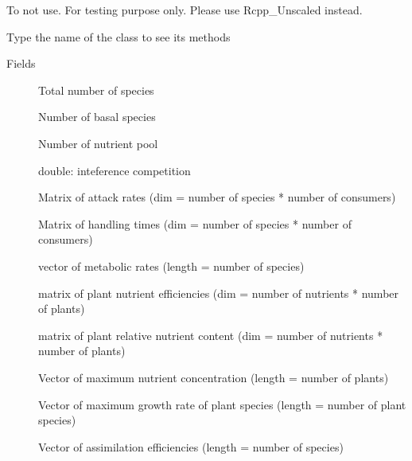 \documentclass[letterpaper]{book}
\begin{document}
%
\begin{Description}\relax
To not use. For testing purpose only. Please use Rcpp\_Unscaled instead.
\end{Description}
%
\begin{Description}\relax
Type the name of the class to see its methods
\end{Description}
%
\begin{Section}{Fields}

\begin{description}

\item[] Total number of species

\item[] Number of basal species

\item[] Number of nutrient pool

\item[] double: inteference competition

\item[] Matrix of attack rates (dim = number of species * number of consumers)

\item[] Matrix of handling times (dim = number of species * number of consumers)

\item[] vector of metabolic rates (length = number of species)

\item[] matrix of plant nutrient efficiencies (dim = number of nutrients * number of plants)

\item[] matrix of plant relative nutrient content (dim = number of nutrients * number of plants)

\item[] Vector of maximum nutrient concentration (length = number of plants)

\item[] Vector of maximum growth rate of plant species (length = number of plant species)

\item[] Vector of assimilation efficiencies (length = number of species)


\end{description}
\end{Section}
\end{document}
